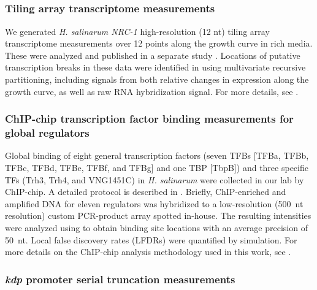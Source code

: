 
\textcolor{red}{}

\subsection{\halo}\label{halodata}

\subsubsection{Tiling array transcriptome measurements}

We generated {\it H. salinarum NRC-1} high-resolution (12 nt) tiling
array transcriptome measurements over 12 points along the growth curve
in rich media. These were analyzed and published in a separate study
\cite{Koide2009}. Locations of putative transcription breaks in these data were
identified in \cite{Koide2009} using multivariate recursive
partitioning, including signals from both relative changes in
expression along the growth curve, as well as raw RNA hybridization
signal. For more details, see \cite{Koide2009}.

\subsubsection{ChIP-chip transcription factor binding measurements for global regulators}

Global binding of eight general transcription factors (seven TFBs
[TFBa, TFBb, TFBc, TFBd, TFBe, TFBf, and TFBg] and one TBP [TbpB]) and
three specific TFs (Trh3, Trh4, and VNG1451C) in {\it H. salinarum}
were collected in our lab by ChIP-chip. A detailed protocol is
described in \cite{Facciotti2007}. Briefly, ChIP-enriched and
amplified DNA for eleven regulators was hybridized to a low-resolution
(500~nt resolution) custom PCR-product array spotted in-house. The
resulting intensities were analyzed using
{} \cite{Reiss2008} to obtain binding site locations
with an average precision of 50~nt. Local false discovery rates
(LFDRs) were quantified by simulation. For more details on the
ChIP-chip analysis methodology used in this work,
see \cite{Reiss2008}.

\subsubsection{\textit{kdp} promoter serial truncation measurements}

